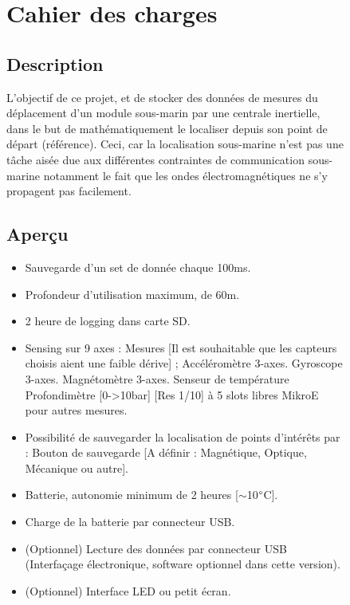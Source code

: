 \begin{figure}

\hfill


\begin{minipage}{1\textwidth}
\section{Cahier des charges}

\subsection{Description}
L’objectif de ce projet, et de stocker des données de mesures du déplacement d’un module sous-marin par une centrale inertielle, dans le but de mathématiquement le localiser depuis son point de départ (référence). Ceci, car la localisation sous-marine n’est pas une tâche aisée due aux différentes contraintes de communication sous-marine notamment le fait que les ondes électromagnétiques ne s’y propagent pas facilement.
\end{minipage} \vspace{+4mm}

\begin{minipage}{1\textwidth}

\subsection{Aperçu}
    \begin{itemize}
        \item	Sauvegarde d’un set de donnée chaque 100ms.
        \item	Profondeur d’utilisation maximum, de 60m.
        \item	2 heure de logging dans carte SD.
        \item	Sensing sur 9 axes :
        \subitem Mesures [Il est souhaitable que les capteurs choisis aient une faible dérive] ;
        \subsubitem Accéléromètre 3-axes. 
        \subsubitem	Gyroscope 3-axes.
        \subsubitem	Magnétomètre 3-axes. 
        \subsubitem	Senseur de température
        \subsubitem	Profondimètre [0->10bar] [Res 1/10]
         à 5 slots libres MikroE pour autres mesures. 
        \item Possibilité de sauvegarder la localisation de points d’intérêts par :
        \subitem Bouton de sauvegarde [A définir : Magnétique, Optique, Mécanique ou autre].
        \item Batterie, autonomie minimum de 2 heures [$\sim$10$\degree$C].
        \item Charge de la batterie par connecteur USB.
        \item (Optionnel) Lecture des données par connecteur USB (Interfaçage électronique, software optionnel dans cette version).
        \item (Optionnel) Interface LED ou petit écran.\\
    \end{itemize}


\end{minipage}

\end{figure}


